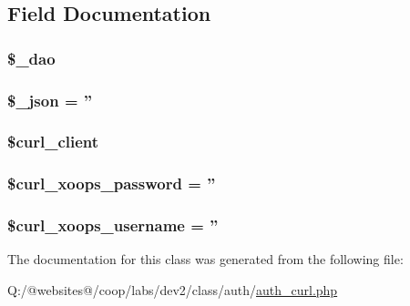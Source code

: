 \subsection{Field Documentation}
\hypertarget{class_xortify_auth_curl_a12a029c610f699b4b25e79a1f64a3485}{
\subsubsection[{\$\-\_\-dao}]{\setlength{\rightskip}{0pt plus 5cm}\$\-\_\-dao}}\label{class_xortify_auth_curl_a12a029c610f699b4b25e79a1f64a3485}
\hypertarget{class_xortify_auth_curl_a94787b37d92a2dee02534eed4f316589}{
\subsubsection[{\$\-\_\-json}]{\setlength{\rightskip}{0pt plus 5cm}\$\-\_\-json = ''}}\label{class_xortify_auth_curl_a94787b37d92a2dee02534eed4f316589}
\hypertarget{class_xortify_auth_curl_a402f2112991f3227835af80e9df33e38}{
\subsubsection[{\$curl\-\_\-client}]{\setlength{\rightskip}{0pt plus 5cm}\$curl\-\_\-client}}\label{class_xortify_auth_curl_a402f2112991f3227835af80e9df33e38}
\hypertarget{class_xortify_auth_curl_a6c9851541ed3826c67cfe7224c38f0b8}{
\subsubsection[{\$curl\-\_\-xoops\-\_\-password}]{\setlength{\rightskip}{0pt plus 5cm}\$curl\-\_\-xoops\-\_\-password = ''}}\label{class_xortify_auth_curl_a6c9851541ed3826c67cfe7224c38f0b8}
\hypertarget{class_xortify_auth_curl_aab7480ba9f878a02b2c9fd43922fa070}{
\subsubsection[{\$curl\-\_\-xoops\-\_\-username}]{\setlength{\rightskip}{0pt plus 5cm}\$curl\-\_\-xoops\-\_\-username = ''}}\label{class_xortify_auth_curl_aab7480ba9f878a02b2c9fd43922fa070}


The documentation for this class was generated from the following file\-:\begin{DoxyCompactItemize}
\item 
Q\-:/@websites@/coop/labs/dev2/class/auth/\hyperlink{auth__curl_8php}{auth\-\_\-curl.\-php}\end{DoxyCompactItemize}

